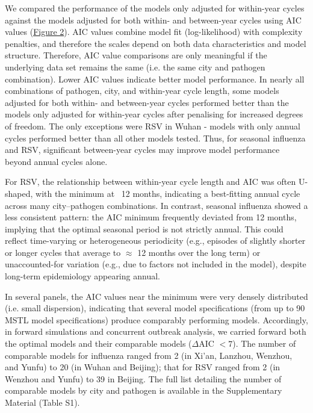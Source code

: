 We compared the performance of the models only adjusted for within-year cycles against the models adjusted for both within- and between-year cycles using AIC values (\hyperref[fig:fig2]{Figure 2}). 
AIC values combine model fit (log-likelihood) with complexity penalties, and therefore the scales depend on both data characteristics and model structure.
Therefore, AIC value comparisons are only meaningful if the underlying data set remains the same (i.e. the same city and pathogen combination).
Lower AIC values indicate better model performance.
In nearly all combinations of pathogen, city, and within-year cycle length, some models adjusted for both within- and between-year cycles performed better than the models only adjusted for within-year cycles after penalising for increased degrees of freedom.
The only exceptions were RSV in Wuhan - models with only annual cycles performed better than all other models tested.
Thus, for seasonal influenza and RSV, significant between-year cycles may improve model performance beyond annual cycles alone.

For RSV, the relationship between within-year cycle length and AIC was often U-shaped, with the minimum at ~12 months, indicating a best-fitting annual cycle across many city–pathogen combinations. 
In contrast, seasonal influenza showed a less consistent pattern: the AIC minimum frequently deviated from 12 months, implying that the optimal seasonal period is not strictly annual. 
This could reflect time-varying or heterogeneous periodicity (e.g., episodes of slightly shorter or longer cycles that average to $\approx$ 12 months over the long term) or unaccounted-for variation (e.g., due to factors not included in the model), despite long-term epidemiology appearing annual.

In several panels, the AIC values near the minimum were very densely distributed (i.e. small dispersion), indicating that several model specifications (from up to 90 MSTL model specifications) produce comparably performing models.
Accordingly, in forward simulations and concurrent outbreak analysis, we carried forward both the optimal models and their comparable models ($\Delta$AIC $< 7$).
The number of comparable models for influenza ranged from 2 (in Xi'an, Lanzhou, Wenzhou, and Yunfu) to 20 (in Wuhan and Beijing); that for RSV ranged from 2 (in Wenzhou and Yunfu) to 39 in Beijing.
The full list detailing the number of comparable models by city and pathogen is available in the Supplementary Material (Table S1).


